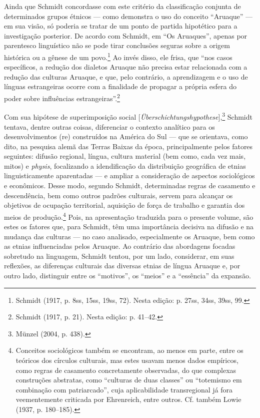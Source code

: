 Ainda que Schmidt concordasse com este critério da classificação
conjunta de determinados grupos étnicos --- como demonstra o uso do
conceito ``Aruaque'' --- em sua visão, só poderia se tratar de um ponto
de partida hipotético para a investigação posterior. De acordo com
Schmidt, em ``Os Aruaques'', apenas por parentesco linguístico não se
pode tirar conclusões seguras sobre a origem histórica ou a gênese de um
povo.\footnote{Schmidt (1917, p. 8ss, 15ss, 19ss, 72). Nesta edição: p.
  27ss, 34ss, 39ss, 99.} Ao invés disso, ele frisa, que ``nos casos
específicos, a redução dos dialetos Aruaque não precisa estar
relacionada com a redução das culturas Aruaque, e que, pelo contrário, a
aprendizagem e o uso de línguas estrangeiras ocorre com a finalidade de
propagar a própria esfera do poder sobre influências
estrangeiras''.\footnote{Schmidt (1917, p. 21). Nesta edição: p. 41--42.}

Com sua hipótese de superimposição social
{[}\emph{Überschichtungshypothese}{]},\footnote{Münzel (2004, p. 438).}
Schmidt tentava, dentre outras coisas, diferenciar o contexto analítico
para os desenvolvimentos (re) construídos na América do Sul --- que se
orientava, como dito, na pesquisa alemã das Terras Baixas da época,
principalmente pelos fatores seguintes: difusão regional, língua,
cultura material (bem como, cada vez mais, mitos) e \emph{physis},
focalizando a idendificação da distribuição geográfica de etnias
linguisticamente aparentadas --- e ampliar a consideração de aspectos
sociológicos e econômicos. Desse modo, segundo Schmidt, determinadas
regras de casamento e descendência, bem como outros padrões culturais,
servem para alcançar os objetivos de ocupação territorial, aquisição de
força de trabalho e garantia dos meios de produção.\footnote{Conceitos
  sociológicos também se encontram, ao menos em parte, entre os teóricos
  dos círculos culturais, mas estes usavam menos dados empíricos, como
  regras de casamento concretamente observadas, do que complexas
  construções abstratas, como ``culturas de duas classes'' ou
  ``totemismo em combinação com patriarcado'', cuja aplicabilidade
  transregional já fora veementemente criticada por Ehrenreich, entre
  outros. Cf. também Lowie (1937, p. 180--185).} Pois, na apresentação
traduzida para o presente volume, são estes os fatores que, para
Schmidt, têm uma importância decisiva na difusão e na mudança das
culturas --- no caso analisado, especialmente os Aruaque, bem como as
etnias influenciadas pelos Aruaque. Ao contrário das abordagens focadas
sobretudo na linguagem, Schmidt tentou, por um lado, considerar, em
suas reflexões, as diferenças culturais das diversas etnias de língua
Aruaque e, por outro lado, distinguir entre os ``motivos'', os ``meios''
e a ``essência'' da expansão.

